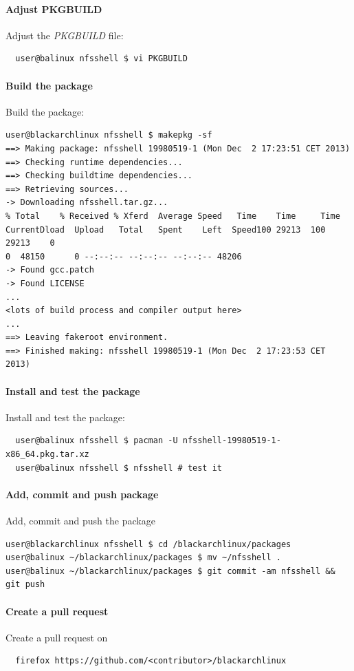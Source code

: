 \documentclass[a4paper, oneside,12pt]{scrartcl}
\def\href#1#2{\htmladdnormallink{#2}{#1}}
\begin{document}
\paragraph{Adjust PKGBUILD}
Adjust the \textit{PKGBUILD} file:
\begin{lstlisting}
  user@balinux nfsshell $ vi PKGBUILD
\end{lstlisting}

\paragraph{Build the package}
Build the package:
\begin{lstlisting}user@blackarchlinux nfsshell $ makepkg -sf
==> Making package: nfsshell 19980519-1 (Mon Dec  2 17:23:51 CET 2013)
==> Checking runtime dependencies...
==> Checking buildtime dependencies...
==> Retrieving sources...
-> Downloading nfsshell.tar.gz...
% Total    % Received % Xferd  Average Speed   Time    Time     Time
CurrentDload  Upload   Total   Spent    Left  Speed100 29213  100 29213    0
0  48150      0 --:--:-- --:--:-- --:--:-- 48206
-> Found gcc.patch
-> Found LICENSE
...
<lots of build process and compiler output here>
...
==> Leaving fakeroot environment.
==> Finished making: nfsshell 19980519-1 (Mon Dec  2 17:23:53 CET 2013)
\end{lstlisting}

\paragraph{Install and test the package}
Install and test the package:
\begin{lstlisting}
  user@balinux nfsshell $ pacman -U nfsshell-19980519-1-x86_64.pkg.tar.xz
  user@balinux nfsshell $ nfsshell # test it
\end{lstlisting}

\paragraph{Add, commit and push package}
Add, commit and push the package
\begin{lstlisting}user@blackarchlinux nfsshell $ cd /blackarchlinux/packages
user@balinux ~/blackarchlinux/packages $ mv ~/nfsshell .
user@balinux ~/blackarchlinux/packages $ git commit -am nfsshell && git push
\end{lstlisting}

\paragraph{Create a pull request}
Create a pull request on \href{https://github.com/}{github.com}
\begin{lstlisting}
  firefox https://github.com/<contributor>/blackarchlinux
\end{lstlisting}
\end{document}
